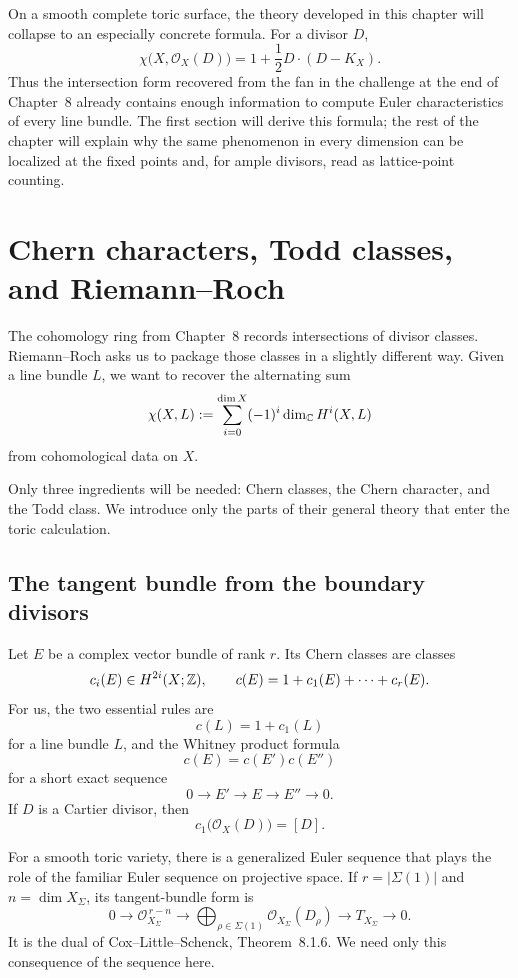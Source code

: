 \begin{surfacelaboratory}
On a smooth complete toric surface, the theory developed in this
chapter will collapse to an especially concrete formula. For a divisor
\(D\),
\[
\boxed{
\chi\bigl(X,\mathcal O_X(D)\bigr)
=
1+\frac12 D\cdot(D-K_X).
}
\]
Thus the intersection form recovered from the fan in the challenge at
the end of Chapter~8 already contains enough information to compute
Euler characteristics of every line bundle. The first section will
derive this formula; the rest of the chapter will explain why the same
phenomenon in every dimension can be localized at the fixed points and,
for ample divisors, read as lattice-point counting.
\end{surfacelaboratory}

\section{Chern characters, Todd classes, and Riemann--Roch}
\label{sec:chern-todd-hrr}

The cohomology ring from Chapter~8 records intersections of divisor
classes. Riemann--Roch asks us to package those classes in a slightly
different way. Given a line bundle \(L\), we want to recover the
alternating sum
\[
\chi(X,L)
:=
\sum_{i=0}^{\dim X}(-1)^i\dim_{\mathbb{C}} H^i(X,L)
\]
from cohomological data on \(X\).

Only three ingredients will be needed: Chern classes, the Chern
character, and the Todd class. We introduce only the parts of their
general theory that enter the toric calculation.

\subsection{The tangent bundle from the boundary divisors}

Let \(E\) be a complex vector bundle of rank \(r\). Its Chern classes
are classes
\[
c_i(E)\in H^{2i}(X;\mathbb{Z}),
\qquad
c(E)=1+c_1(E)+\cdots+c_r(E).
\]
For us, the two essential rules are
\[
c(L)=1+c_1(L)
\]
for a line bundle \(L\), and the Whitney product formula
\[
c(E)=c(E')c(E'')
\]
for a short exact sequence
\[
0\longrightarrow E'
\longrightarrow E
\longrightarrow E''
\longrightarrow0.
\]
If \(D\) is a Cartier divisor, then
\[
c_1\bigl(\mathcal O_X(D)\bigr)=[D].
\]

For a smooth toric variety, there is a generalized Euler sequence that
plays the role of the familiar Euler sequence on projective space. If
\(r=|\Sigma(1)|\) and \(n=\dim X_\Sigma\), its tangent-bundle form is
\[
0
\longrightarrow
\mathcal O_{X_\Sigma}^{\,r-n}
\longrightarrow
\bigoplus_{\rho\in\Sigma(1)}
\mathcal O_{X_\Sigma}(D_\rho)
\longrightarrow
T_{X_\Sigma}
\longrightarrow0.
\]
It is the dual of Cox--Little--Schenck, Theorem~8.1.6. We need only
this consequence of the sequence here.

